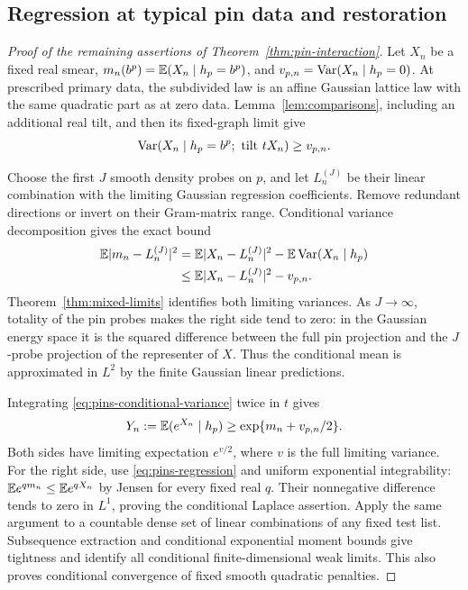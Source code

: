 \subsection{Regression at typical pin data and restoration}

\begin{proof}[Proof of the remaining assertions of
Theorem~\ref{thm:pin-interaction}]
Let \(X_n\) be a fixed real smear,
\(m_n(b^p)=\mathbb E(X_n\mid h_p=b^p)\), and
\(v_{p,n}=\operatorname{Var}(X_n\mid h_p=0)\).
At prescribed primary data, the subdivided law is an
affine Gaussian lattice law with the same quadratic
part as at zero data. Lemma~\ref{lem:comparisons},
including an additional real tilt, and then its
fixed-graph limit give
\begin{equation}
       \operatorname{Var}(X_n\mid h_p=b^p;\text{ tilt }tX_n)\ge v_{p,n}.
 \label{eq:pins-conditional-variance}
\end{equation}

Choose the first \(J\) smooth density probes on \(p\),
and let \(L_n^{(J)}\) be their linear combination
with the limiting Gaussian regression coefficients.
Remove redundant directions or invert on their
Gram-matrix range. Conditional variance decomposition
gives the exact bound
\begin{align}
 \mathbb E|m_n-L_n^{(J)}|^2
 &=\mathbb E|X_n-L_n^{(J)}|^2
                   -\mathbb E\operatorname{Var}(X_n\mid h_p)\notag\\
 &\le \mathbb E|X_n-L_n^{(J)}|^2-v_{p,n}.
 \label{eq:pins-regression}
\end{align}
Theorem~\ref{thm:mixed-limits} identifies both limiting
variances. As \(J\to\infty\), totality of the pin
probes makes the right side tend to zero: in the
Gaussian energy space it is the squared difference
between the full pin projection and the \(J\)-probe
projection of the representer of \(X\).
Thus the conditional mean is approximated in \(L^2\)
by the finite Gaussian linear predictions.

Integrating \eqref{eq:pins-conditional-variance}
twice in \(t\) gives
\[
 Y_n:=\mathbb E(e^{X_n}\mid h_p)
             \ge\exp\{m_n+v_{p,n}/2\}.
\]
Both sides have limiting expectation \(e^{v/2}\),
where \(v\) is the full limiting variance.
For the right side, use \eqref{eq:pins-regression}
and uniform exponential integrability:
\(\mathbb E e^{q m_n}\le\mathbb E e^{qX_n}\) by Jensen for
every fixed real \(q\).
Their nonnegative difference tends to zero in
\(L^1\), proving the conditional Laplace assertion.
Apply the same argument to a countable dense set
of linear combinations of any fixed test list.
Subsequence extraction and conditional exponential
moment bounds give tightness and identify all
conditional finite-dimensional weak limits.
This also proves conditional convergence of fixed
smooth quadratic penalties.


\end{proof}
